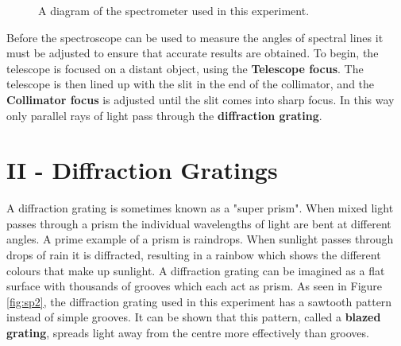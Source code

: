 \begin{figure}[t]
\caption{A diagram of the spectrometer used in this experiment.}
\label{fig:sp1}
\end{figure}

Before the spectroscope can be used to measure the angles of spectral lines it must be adjusted to ensure that accurate results are obtained. To begin, the telescope is focused on a distant object, using the {\bf Telescope focus}. The telescope is then lined up with the slit in the end of the collimator, and the {\bf Collimator focus} is adjusted until the slit comes into sharp focus. In this way only parallel rays of light pass through the {\bf diffraction grating}.

\section{II - Diffraction Gratings}
A diffraction grating is sometimes known as a "super prism". When mixed light passes through a prism the individual wavelengths of light are bent at different angles. A prime example of a prism is raindrops. When sunlight passes through drops of rain it is diffracted, resulting in a rainbow which shows the different colours that make up sunlight. A diffraction grating  can be imagined as a flat surface with thousands of grooves which each act as prism. As seen in Figure \ref{fig:sp2}, the diffraction grating used in this experiment has a sawtooth pattern instead of simple grooves. It can be shown that this pattern, called a {\bf blazed grating}, spreads light away from the centre more effectively than grooves.

